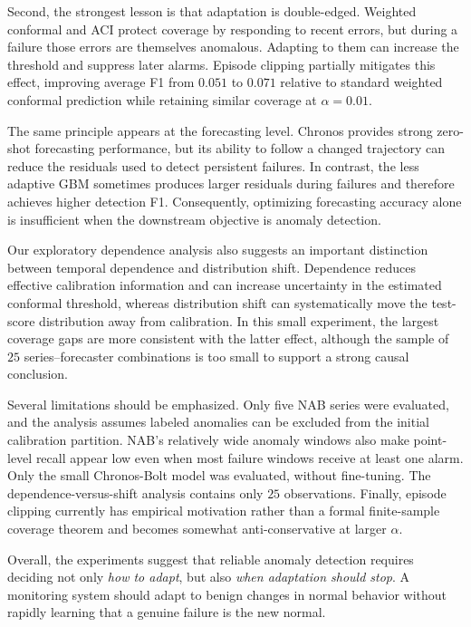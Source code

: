 \documentclass[11pt]{article}
\theoremstyle{definition}
\theoremstyle{remark}
\begin{document}
Second, the strongest lesson is that adaptation is double-edged. Weighted conformal and ACI protect coverage by responding to recent errors, but during a failure those errors are themselves anomalous. Adapting to them can increase the threshold and suppress later alarms. Episode clipping partially mitigates this effect, improving average F1 from $0.051$ to $0.071$ relative to standard weighted conformal prediction while retaining similar coverage at $\alpha = 0.01$.

The same principle appears at the forecasting level. Chronos provides strong zero-shot forecasting performance, but its ability to follow a changed trajectory can reduce the residuals used to detect persistent failures. In contrast, the less adaptive GBM sometimes produces larger residuals during failures and therefore achieves higher detection F1. Consequently, optimizing forecasting accuracy alone is insufficient when the downstream objective is anomaly detection.

Our exploratory dependence analysis also suggests an important distinction between temporal dependence and distribution shift. Dependence reduces effective calibration information and can increase uncertainty in the estimated conformal threshold, whereas distribution shift can systematically move the test-score distribution away from calibration. In this small experiment, the largest coverage gaps are more consistent with the latter effect, although the sample of $25$ series--forecaster combinations is too small to support a strong causal conclusion.

Several limitations should be emphasized. Only five NAB series were evaluated, and the analysis assumes labeled anomalies can be excluded from the initial calibration partition. NAB's relatively wide anomaly windows also make point-level recall appear low even when most failure windows receive at least one alarm. Only the small Chronos-Bolt model was evaluated, without fine-tuning. The dependence-versus-shift analysis contains only $25$ observations. Finally, episode clipping currently has empirical motivation rather than a formal finite-sample coverage theorem and becomes somewhat anti-conservative at larger $\alpha$.

Overall, the experiments suggest that reliable anomaly detection requires deciding not only \emph{how to adapt}, but also \emph{when adaptation should stop}. A monitoring system should adapt to benign changes in normal behavior without rapidly learning that a genuine failure is the new normal.
\end{document}
